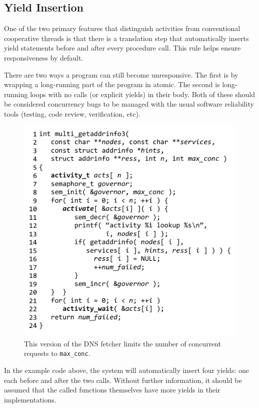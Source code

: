 \documentclass[sigplan,10pt,review,anonymous]{acmart}\settopmatter{printfolios=true,printccs=false,printacmref=false}
\begin{document}
\subsection{Yield Insertion}

One of the two primary features that distinguish activities from conventional cooperative threads is that there is a translation step that automatically inserts yield statements before and after every procedure call.
This rule helps ensure responsiveness by default.

There are two ways a program can still become unresponsive.
The first is by wrapping a long-running part of the program in atomic.
The second is long-running loops with no calls (or explicit yields) in their body.
Both of these should be considered concurrency bugs to be managed with the usual software reliability tools (testing, code review, verification, etc).

\begin{figure}
\includegraphics{multi_getaddrinfo_sem}
\caption{This version of the DNS fetcher limits the number of concurrent requests to \texttt{max\_conc}.}
\label{fig:charcoal_multidns_sem}
\end{figure}

In the example code above, the system will automatically insert four yields: one each before and after the two calls.
Without further information, it should be assumed that the called functions themselves have more yields in their implementations.
\end{document}
